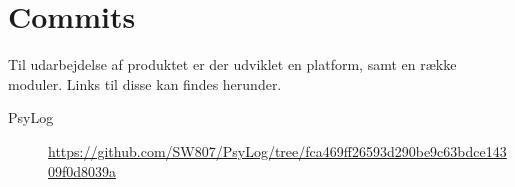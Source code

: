 \chapter{Commits}
Til udarbejdelse af produktet er der udviklet en platform, samt en række moduler.
Links til disse kan findes herunder.

\begin{description}
	\item[PsyLog] \url{https://github.com/SW807/PsyLog/tree/fca469ff26593d290be9c63bdce14309f0d8039a}
\end{description}